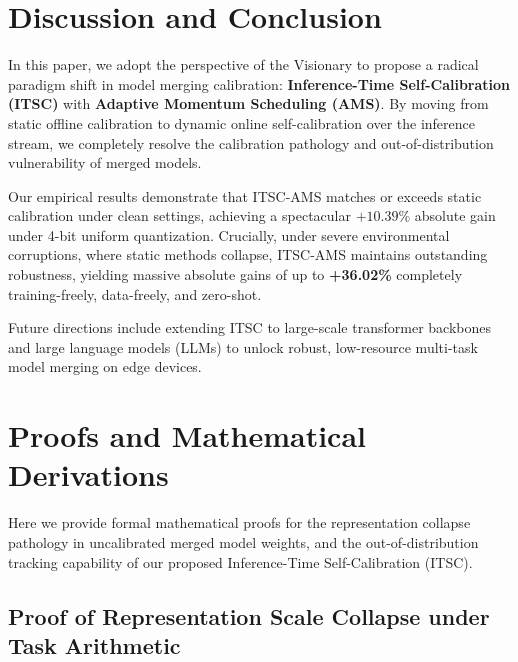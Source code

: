 \documentclass{article}
\theoremstyle{plain}
\theoremstyle{definition}
\theoremstyle{remark}
\begin{document}
\section{Discussion and Conclusion}
\label{sec:conclusion}

In this paper, we adopt the perspective of the Visionary to propose a radical paradigm shift in model merging calibration: \textbf{Inference-Time Self-Calibration (ITSC)} with \textbf{Adaptive Momentum Scheduling (AMS)}. By moving from static offline calibration to dynamic online self-calibration over the inference stream, we completely resolve the calibration pathology and out-of-distribution vulnerability of merged models. 

Our empirical results demonstrate that ITSC-AMS matches or exceeds static calibration under clean settings, achieving a spectacular $+10.39\%$ absolute gain under 4-bit uniform quantization. Crucially, under severe environmental corruptions, where static methods collapse, ITSC-AMS maintains outstanding robustness, yielding massive absolute gains of up to \textbf{+36.02\%} completely training-freely, data-freely, and zero-shot. 

Future directions include extending ITSC to large-scale transformer backbones and large language models (LLMs) to unlock robust, low-resource multi-task model merging on edge devices.




\newpage
\appendix
\onecolumn
\section{Proofs and Mathematical Derivations}
\label{app:proofs}

Here we provide formal mathematical proofs for the representation collapse pathology in uncalibrated merged model weights, and the out-of-distribution tracking capability of our proposed Inference-Time Self-Calibration (ITSC).

\subsection{Proof of Representation Scale Collapse under Task Arithmetic}
\end{document}
